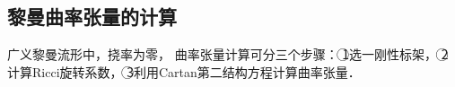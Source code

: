 




\subsection{黎曼曲率张量的计算}\label{chrg:sec_RCrf}
    广义黎曼流形中，挠率为零，
    曲率张量计算可分三个步骤\cite[\S 1.7]{chandrasekhar-1983}：
    \textcircled{1}选一{\kaishu 刚性}标架，
    \textcircled{2}计算Ricci旋转系数，
    \textcircled{3}利用Cartan第二结构方程计算曲率张量．

